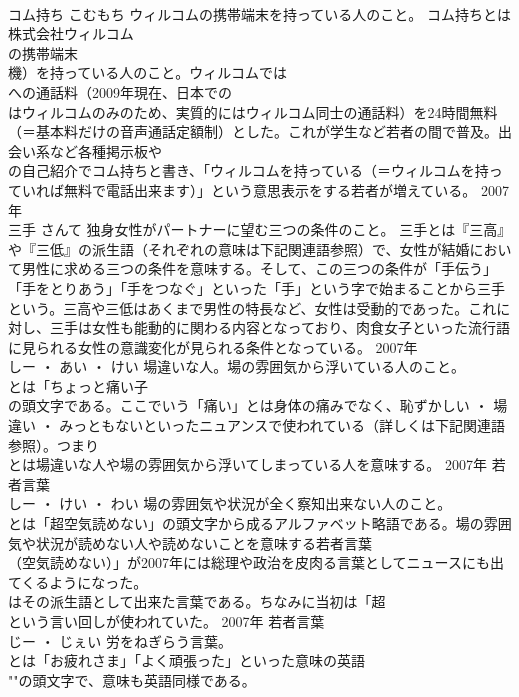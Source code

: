 \documentclass[8pt]{extreport}
\begin{document}
\begin{CJK}{UTF8}{min}
\\	コム持ち	こむもち	ウィルコムの携帯端末を持っている人のこと。	コム持ちとは株式会社ウィルコム
\\	の携帯端末
\\	機）を持っている人のこと。ウィルコムでは
\\	への通話料（2009年現在、日本での
\\	はウィルコムのみのため、実質的にはウィルコム同士の通話料）を24時間無料（＝基本料だけの音声通話定額制）とした。これが学生など若者の間で普及。出会い系など各種掲示板や
\\	の自己紹介でコム持ちと書き、「ウィルコムを持っている（＝ウィルコムを持っていれば無料で電話出来ます）」という意思表示をする若者が増えている。	2007年	
\\	三手	さんて	独身女性がパートナーに望む三つの条件のこと。	三手とは『三高』や『三低』の派生語（それぞれの意味は下記関連語参照）で、女性が結婚において男性に求める三つの条件を意味する。そして、この三つの条件が「手伝う」「手をとりあう」「手をつなぐ」といった「手」という字で始まることから三手という。三高や三低はあくまで男性の特長など、女性は受動的であった。これに対し、三手は女性も能動的に関わる内容となっており、肉食女子といった流行語に見られる女性の意識変化が見られる条件となっている。	2007年	
\\	しー ・ あい ・ けい	場違いな人。場の雰囲気から浮いている人のこと。	
\\	とは「ちょっと痛い子
\\	の頭文字である。ここでいう「痛い」とは身体の痛みでなく、恥ずかしい ・ 場違い ・ みっともないといったニュアンスで使われている（詳しくは下記関連語参照）。つまり
\\	とは場違いな人や場の雰囲気から浮いてしまっている人を意味する。	2007年	若者言葉	
\\	しー ・ けい ・ わい	場の雰囲気や状況が全く察知出来ない人のこと。	
\\	とは「超空気読めない」の頭文字から成るアルファベット略語である。場の雰囲気や状況が読めない人や読めないことを意味する若者言葉
\\	（空気読めない）」が2007年には総理や政治を皮肉る言葉としてニュースにも出てくるようになった。
\\	はその派生語として出来た言葉である。ちなみに当初は「超
\\	という言い回しが使われていた。	2007年	若者言葉	
\\	じー ・ じぇい	労をねぎらう言葉。	
\\	とは「お疲れさま」「よく頑張った」といった意味の英語
\\	""の頭文字で、意味も英語同様である。

\end{CJK}
\end{document}
